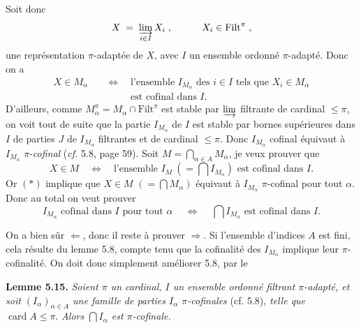 \documentclass[11pt]{article}
\newcommand{\printedpage}[1]{\marginpar{\footnotesize p.~#1}}
\newcommand{\msp}[1]{\marginpar{\footnotesize [#1]}}
\newcommand{\Filt}{\mathrm{Filt}}
\newcommand{\card}{\operatorname{card}}
\begin{document}
\msp{page 69}
Soit donc
\[
X \;=\; \varinjlim_{i\in I} X_{i} \; , \qquad\quad X_{i} \in \Filt^{\pi} \; ,
\]
une représentation $\pi$-adaptée de $X$, avec $I$ un ensemble ordonné $\pi$-adapté. Donc on a
\[
\begin{aligned}
X \in M_{\alpha} \quad &\Longleftrightarrow \quad \text{l'ensemble } I_{M_{\alpha}} \text{ des } i \in I \text{ tels que } X_{i} \in M_{\alpha}\\
&\phantom{\Longleftrightarrow} \quad \text{est cofinal dans } I.
\end{aligned}
\tag*{$(*)$}
\]
D'ailleurs, comme $M_{\alpha}^{\pi} = M_{\alpha} \cap \Filt^{\pi}$ est stable par $\varinjlim$ filtrante de cardinal $\leq \pi$, on voit tout de suite que la partie $I_{M_{\alpha}}$ de $I$ est stable par bornes supérieures dans $I$ de parties $J$ de $I_{M_{\alpha}}$ filtrantes et de cardinal $\leq \pi$. Donc $I_{M_{\alpha}}$ cofinal équivaut à $I_{M_{\alpha}}$ $\pi$-\textit{cofinal} (\textit{cf.} 5.8, page 59). Soit $M = \bigcap_{\alpha\in A} M_{\alpha}$, je veux prouver que
\[
X \in M \quad \Longleftrightarrow \quad \text{l'ensemble } I_{M} \ (= \textstyle\bigcap I_{M_{\alpha}}) \text{ est cofinal dans } I.
\tag*{$(**)$}
\]
Or $(*)$ implique que $X \in M$ $(= \bigcap M_{\alpha})$ équivaut à $I_{M_{\alpha}}$ $\pi$-cofinal pour tout $\alpha$. Donc au total on veut prouver
\[
I_{M_{\alpha}} \text{ cofinal dans } I \text{ pour tout } \alpha \quad\ \Longleftrightarrow \quad\ \textstyle\bigcap I_{M_{\alpha}} \text{ est cofinal dans } I.
\tag*{$(***)$}
\]

\msp{page 70}
On a bien sûr $\Longleftarrow$, donc il reste à prouver $\Longrightarrow$. Si l'ensemble d'indices $A$ est fini, cela résulte du lemme 5.8, compte tenu que la cofinalité des $I_{M_{\alpha}}$ implique leur $\pi$-cofinalité. On doit donc simplement améliorer 5.8, par le

\printedpage{40}

\textbf{Lemme 5.15.} \textit{Soient $\pi$ un cardinal, $I$ un ensemble ordonné filtrant $\pi$-adapté, et soit $(I_{\alpha})_{\alpha\in A}$ une famille de parties $I_{\alpha}$ $\pi$-cofinales} (cf. 5.8), \textit{telle que} $\card A \leq \pi$. \textit{Alors $\bigcap I_{\alpha}$ est $\pi$-cofinale.}
\end{document}
